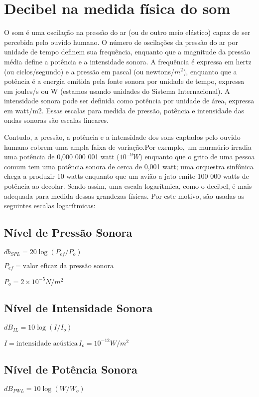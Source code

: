 \section{Decibel na medida física do som}
    O som é uma oscilação na pressão do ar (ou de outro meio elástico) capaz de ser percebida pelo ouvido humano. O número de oscilações da pressão do ar por unidade de tempo definem sua frequência, enquanto que a magnitude da pressão média define a potência e a intensidade sonora. A frequência é expressa em hertz (ou ciclos/segundo) e a pressão em pascal (ou newtons/$m^2$), enquanto que a potência é a energia emitida pela fonte sonora por unidade de tempo, expressa em joules/s ou W (estamos usando unidades do Sistema Internacional). A intensidade sonora pode ser definida como potência por unidade de área, expressa em watt/m2. Essas escalas para medida de pressão, potência e intensidade das ondas sonoras são escalas lineares.

    Contudo, a pressão, a potência e a intensidade dos sons captados pelo ouvido humano cobrem uma ampla faixa de variação.Por exemplo, um murmúrio irradia uma potência de 0,000 000 001 watt ($10^{-9} W$) enquanto que o grito de uma pessoa comum tem uma potência sonora de cerca de 0,001 watt; uma orquestra sinfônica chega a produzir 10 watts enquanto que um avião a jato emite 100 000 watts de potência ao decolar. Sendo assim, uma escala logarítmica, como o decibel, é mais adequada para medida dessas grandezas físicas. Por este motivo, são usadas as seguintes escalas logarítmicas:
    
    \subsection{Nível de Pressão Sonora}
        ${db_{SPL}} = 20 \log (P_{ef} / P_{o})$
        
        $P_{ef} = \text{valor eficaz da pressão sonora}$
        
        $P_{o} = 2 \times 10^{-5} N / m^{2}$
    
    \subsection{Nível de Intensidade Sonora}
        $dB_{IL} = 10 \log(I/I_{o})$

        $I = \text{intensidade acústica} \, I_{o} = 10^{-12} W / m^{2}$
    
    \subsection{Nível de Potência Sonora}
        $dB_{PWL} = 10 \log (W/W_{o})$

